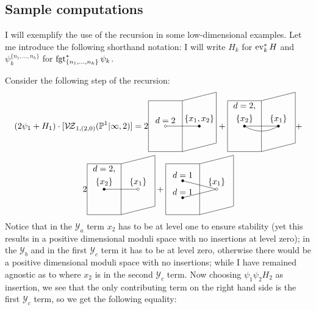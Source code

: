 \subsection{Sample computations} I will exemplify the use of the recursion in some low-dimensional examples. Let me introduce the following shorthand notation: I will write $H_k$ for $\operatorname{ev}_k^* H$ and $\psi_k^{\{n_1,\ldots,n_h\}}$ for $\operatorname{fgt}_{\{n_1,\ldots,n_h\}}^*\psi_k$.
\begin{ex}
 Consider the following step of the recursion:
 \begin{multline*} (2\psi_1+H_1)\cdot [\VZ{(2,0)}{\PP^1|\infty}{2}]= 2{\tikz[baseline=-3pt,scale=.7]{
\draw (2,0) node[above]{$\{x_1,x_2\}$} -- (0,0)node[above]{$d=2$};
\draw (2,0) circle(2pt)[fill=black];
\draw (0,0) circle(2pt)[fill=white];
\draw (-1,1.5) -- (1,1.5) -- (1,-1.5) -- (-1,-1.5) -- (-1,1.5);
\draw (1,1.5) -- (3,2) -- (3,-1) -- (1,-1.5);
}}+
{\tikz[baseline=-3pt,scale=.7]{
\draw (2,0) node[above]{$\{x_1\}$} to[out=210,in=-30] (0,0)node[above,align=center]{$d=2$,\\ $\{x_2\}$} (2,0) -- (0,0);
\draw (2,0) circle(2pt)[fill=black];
\draw (0,0) circle(2pt)[fill=black];
\draw (-1,1.5) -- (1,1.5) -- (1,-1.5) -- (-1,-1.5) -- (-1,1.5);
\draw (1,1.5) -- (3,2) -- (3,-1) -- (1,-1.5);
}}+\\
2{\tikz[baseline=-3pt,scale=.7]{
\draw (2,0) node[above]{$\{x_1\}$} -- (0,0)node[above,align=center]{$d=2$,\\ $\{x_2\}$};
\draw (2,0) circle(2pt)[fill=white];
\draw (0,0) circle(2pt)[fill=black];
\draw (-1,1.5) -- (1,1.5) -- (1,-1.5) -- (-1,-1.5) -- (-1,1.5);
\draw (1,1.5) -- (3,2) -- (3,-1) -- (1,-1.5);
}}+
{\tikz[baseline=-3pt,scale=.7]{
\draw (2,0) node[above]{$\{x_1\}$} -- (0,.5)node[above]{$d=1$} (2,0)--(0,-.5)node[above]{$d=1$};
\draw (2,0) circle(2pt)[fill=white];
\draw (0,0.5) circle(2pt)[fill=black] (0,-0.5) circle(2pt)[fill=black];
\draw (-1,1.5) -- (1,1.5) -- (1,-1.5) -- (-1,-1.5) -- (-1,1.5);
\draw (1,1.5) -- (3,2) -- (3,-1) -- (1,-1.5);
}}
\end{multline*}
Notice that in the $\mathcal Y_a$ term $x_2$ has to be at level one to ensure stability (yet this results in a positive dimensional moduli space with no insertions at level zero); in the $\mathcal Y_b$ and in the first $\mathcal Y_c$ term it has to be at level zero, otherwise there would be a positive dimensional moduli space with no insertions; while I have remained agnostic as to where $x_2$ is in the second $\mathcal Y_c$ term. Now choosing $\psi_1\psi_2H_2$ as insertion, we see that the only contributing term on the right hand side is the first $\mathcal Y_c$ term, so we get the following equality:

\end{ex}
